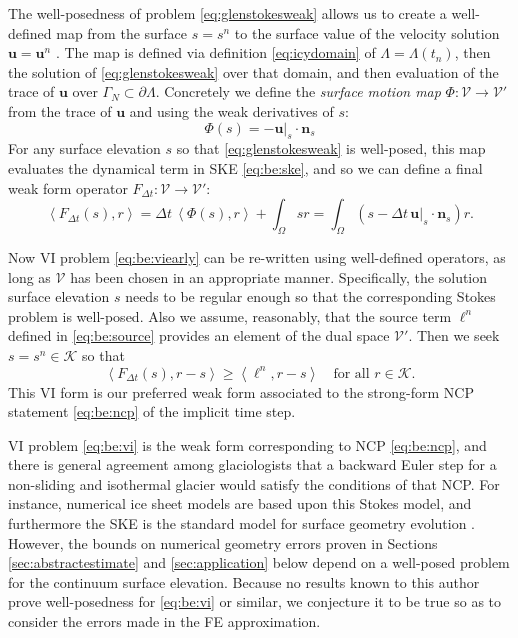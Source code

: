 \documentclass[hidelinks,onefignum,onetabnum,final]{siamart220329}  %
\newcommand{\bn}{\mathbf{n}}
\newcommand{\bu}{\mathbf{u}}
\newcommand{\cK}{\mathcal{K}}
\newcommand{\cV}{\mathcal{V}}
\newcommand{\ip}[2]{\left<#1,#2\right>}
\begin{document}
The well-posedness of problem \eqref{eq:glenstokesweak} allows us to create a well-defined map from the surface $s=s^n$ to the surface value of the velocity solution $\bu=\bu^n$ .  The map is defined via definition \eqref{eq:icydomain} of $\Lambda=\Lambda(t_n)$, then the solution of \eqref{eq:glenstokesweak} over that domain, and then evaluation of the trace of $\bu$ over $\Gamma_N\subset \partial\Lambda$.  Concretely we define the \emph{surface motion map} $\Phi:\cV \to \cV'$ from the trace of $\bu$ and using the weak derivatives of $s$:
\begin{equation}
\Phi(s) = - \bu|_s\cdot \bn_s \label{eq:be:Phidefine}
\end{equation}
For any surface elevation $s$ so that \eqref{eq:glenstokesweak} is well-posed, this map evaluates the dynamical term in SKE \eqref{eq:be:ske}, and so we can define a final weak form operator $F_{\Delta t}:\cV\to\cV'$:
\begin{equation}
\ip{F_{\Delta t}(s)}{r} = \Delta t\,\ip{\Phi(s)}{r} + \int_\Omega s r = \int_\Omega \left(s - \Delta t\, \bu|_s \cdot \bn_s\right) r.  \label{eq:be:Fdefine}
\end{equation}

Now VI problem \eqref{eq:be:viearly} can be re-written using well-defined operators, as long as $\cV$ has been chosen in an appropriate manner.  Specifically, the solution surface elevation $s$ needs to be regular enough so that the corresponding Stokes problem is well-posed.  Also we assume, reasonably, that the source term $\ell^n$ defined in \eqref{eq:be:source} provides an element of the dual space $\cV'$.  Then we seek $s = s^n \in \cK$ so that
\begin{equation}
\ip{F_{\Delta t}(s)}{r-s} \ge \ip{\ell^n}{r-s} \quad \text{for all } r \in \cK. \label{eq:be:vi}
\end{equation}
This VI form is our preferred weak form associated to the strong-form NCP statement \eqref{eq:be:ncp} of the implicit time step.

VI problem \eqref{eq:be:vi} is the weak form corresponding to NCP \eqref{eq:be:ncp}, and there is general agreement among glaciologists that a backward Euler step for a non-sliding and isothermal glacier would satisfy the conditions of that NCP.  For instance, numerical ice sheet models \cite{IsaacStadlerGhattas2015,WirbelJarosch2020} are based upon this Stokes model, and furthermore the SKE is the standard model for surface geometry evolution \cite{GreveBlatter2009,SchoofHewitt2013}.  However, the bounds on numerical geometry errors proven in Sections \ref{sec:abstractestimate} and \ref{sec:application} below depend on a well-posed problem for the continuum surface elevation.  Because no results known to this author prove well-posedness for \eqref{eq:be:vi} or similar, we conjecture it to be true so as to consider the errors made in the FE approximation.
\end{document}
